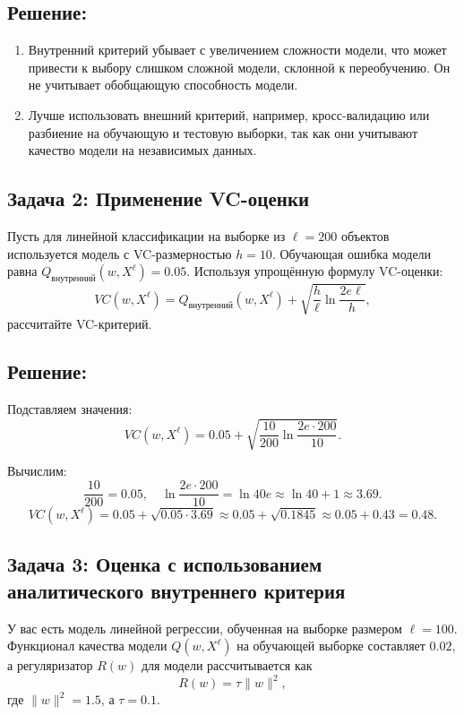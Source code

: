 \subsection*{Решение:}

\begin{enumerate}
    \item Внутренний критерий убывает с увеличением сложности модели, что может привести к выбору слишком сложной модели, склонной к переобучению. Он не учитывает обобщающую способность модели.
    \item Лучше использовать внешний критерий, например, кросс-валидацию или разбиение на обучающую и тестовую выборки, так как они учитывают качество модели на независимых данных.
\end{enumerate}


\subsection*{Задача 2: Применение VC-оценки}

Пусть для линейной классификации на выборке из $\ell = 200$ объектов используется модель с VC-размерностью $h = 10$. Обучающая ошибка модели равна $Q_{\text{внутренний}}(w, X^\ell) = 0.05$. Используя упрощённую формулу VC-оценки:
\[
VC(w, X^\ell) = Q_{\text{внутренний}}(w, X^\ell) + \sqrt{\frac{h}{\ell} \ln \frac{2e\ell}{h}},
\]
рассчитайте VC-критерий.

\subsection*{Решение:}

Подставляем значения:
\[
VC(w, X^\ell) = 0.05 + \sqrt{\frac{10}{200} \ln \frac{2e \cdot 200}{10}}.
\]

Вычислим:
\[
\frac{10}{200} = 0.05, \quad \ln \frac{2e \cdot 200}{10} = \ln 40e \approx \ln 40 + 1 \approx 3.69.
\]
\[
VC(w, X^\ell) = 0.05 + \sqrt{0.05 \cdot 3.69} \approx 0.05 + \sqrt{0.1845} \approx 0.05 + 0.43 = 0.48.
\]


\subsection*{Задача 3: Оценка с использованием аналитического внутреннего критерия}

У вас есть модель линейной регрессии, обученная на выборке размером $\ell = 100$. Функционал качества модели $Q(w, X^\ell)$ на обучающей выборке составляет $0.02$, а регуляризатор $R(w)$ для модели рассчитывается как 
\[
R(w) = \tau \|w\|^2,
\]
где $\|w\|^2 = 1.5$, а $\tau = 0.1$. 

